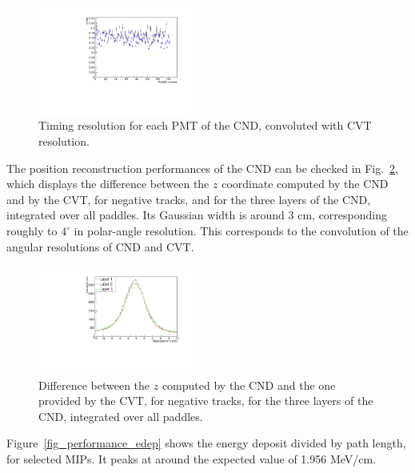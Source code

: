 \begin{figure}[htb]  
\begin{center}
\includegraphics[width=0.45\textwidth]{Figure/VTsigma.pdf}
\caption {Timing resolution for each PMT of the CND, convoluted with CVT resolution.}
\label{fig_performance_vt_sigma_allpaddles}
\end{center}
\end{figure}

The position reconstruction performances of the CND can be checked in Fig.~\ref{fig_performance_deltaz}, which displays the difference between the $z$ coordinate computed by the CND and by the CVT, for negative tracks, and for the three layers of the CND, integrated over all paddles. Its Gaussian width is around 3 cm, corresponding roughly to $4^{\circ}$ in polar-angle resolution. This corresponds to the convolution of the angular resolutions of CND and CVT. 

\begin{figure}[htb]  
\begin{center}
\includegraphics[width=0.45\textwidth]{Figure/canZ.pdf}
\caption {Difference between the $z$ computed by the CND and the one provided by the CVT, for negative tracks, for the three layers of the CND, integrated over all paddles. }
\label{fig_performance_deltaz}
\end{center}
\end{figure}

Figure~\ref{fig_performance_edep} shows the energy deposit divided by path length, for selected MIPs. It peaks at around the expected value of 1.956 MeV/cm.


